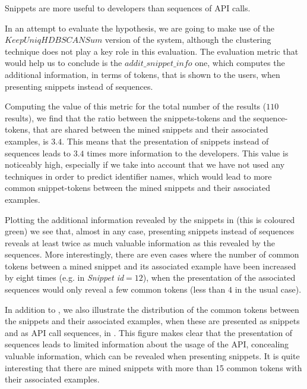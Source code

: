 \begin{hypothesis}
Snippets are more useful to developers than sequences of API calls.
\end{hypothesis}

In an attempt to evaluate the hypothesis, we are going to make use of the\\$KeepUniqHDBSCANSum$ version of the system, although the clustering technique does not play a key role in this evaluation. The evaluation metric that would help us to conclude is the $addit\_snippet\_info$ one, which computes the additional information, in terms of tokens, that is shown to the users, when presenting snippets instead of sequences.

Computing the value of this metric for the total number of the results ($110$ results), we find that the ratio between the snippets-tokens and the sequence-tokens, that are shared between the mined snippets and their associated examples, is $3.4$. This means that the presentation of snippets instead of sequences leads to $3.4$ times more information to the developers. This value is noticeably high, especially if we take into account that we have not used any techniques in order to predict identifier names, which would lead to more common snippet-tokens between the mined snippets and their associated examples.

Plotting the additional information revealed by the snippets in  (this is coloured green) we see that, almost in any case, presenting snippets instead of sequences reveals at least twice as much valuable information as this revealed by the sequences. More interestingly, there are even cases where the number of common tokens between a mined snippet and its associated example have been increased by eight times (e.g. in \textit{Snippet id}$=12$), when the presentation of the associated sequences would only reveal a few common tokens (less than $4$ in the usual case). 

In addition to , we also illustrate the distribution of the common tokens between the snippets and their associated examples, when these are presented as snippets and as API call sequences, in . This figure makes clear that the presentation of sequences leads to limited information about the usage of the API, concealing valuable information, which can be revealed when presenting snippets. It is quite interesting that there are mined snippets with more than 15 common tokens with their associated examples. 

